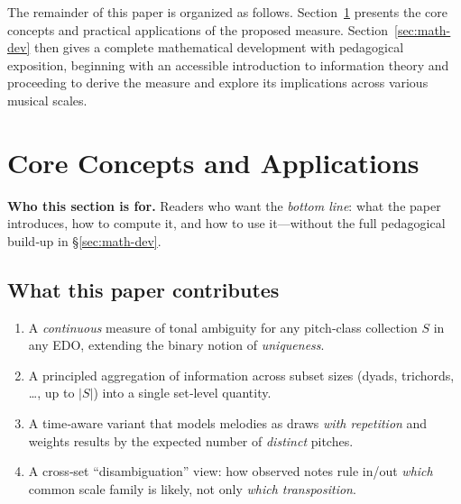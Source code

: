 \documentclass[10pt,twocolumn]{article}
\numberwithin{equation}{section} %
\begin{document}
    The remainder of this paper is organized as follows.
    Section~\ref{sec:core} presents the core concepts and practical applications of the proposed measure.
    Section~\ref{sec:math-dev} then gives a complete mathematical development with pedagogical exposition, beginning with an accessible introduction to information theory and proceeding to derive the measure and explore its implications across various musical scales.


    \section{Core Concepts and Applications}\label{sec:core}

    \noindent\textbf{Who this section is for.}
    Readers who want the \emph{bottom line}: what the paper introduces, how to compute it, and how to use it—without the full pedagogical build‑up in \S\ref{sec:math-dev}.

    \subsection*{What this paper contributes}
    \begin{enumerate}
        \item A \emph{continuous} measure of tonal ambiguity for any pitch‑class collection $S$ in any EDO, extending the binary notion of \emph{uniqueness}.
        \item A principled aggregation of information across subset sizes (dyads, trichords, \dots, up to $|S|$) into a single set‑level quantity.
        \item A time‑aware variant that models melodies as draws \emph{with repetition} and weights results by the expected number of \emph{distinct} pitches.
        \item A cross‑set ``disambiguation'' view: how observed notes rule in/out \emph{which} common scale family is likely, not only \emph{which transposition}.
    \end{enumerate}
\end{document}
